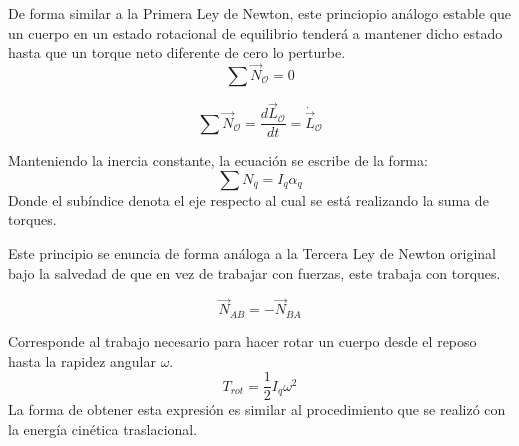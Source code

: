 \documentclass[/home/hernan-barquero/Documents/Apuntes_mecanica_teorica/main.tex]{subfiles}
\begin{document}

	\begin{definition}
		De forma similar a la Primera Ley de Newton, este princiopio análogo estable que un cuerpo en un estado rotacional de equilibrio tenderá a mantener dicho estado hasta que un torque neto diferente de cero lo perturbe.
		\begin{equation}
			\sum \vec{N}_{\mathcal{O}} = 0
			\label{eq: Nfirstlawrot}
		\end{equation}
		
	\end{definition}

	\begin{definition}
		\begin{equation}
			\sum \vec{N}_{\mathcal{O}} = \frac{d \vec{L}_{\mathcal{O}}}{dt} = \dot{\vec{L}}_{\mathcal{O}}
			\label{eq: NSecondlawrot}
		\end{equation}

		Manteniendo la inercia constante, la ecuación se escribe de la forma:
		\begin{equation}
			\sum N_{q} = I_{q} \alpha_{q}
		\end{equation}
		Donde el subíndice denota el eje respecto al cual se está realizando la suma de torques.
	\end{definition}

	\newpage
	\begin{definition} 
		Este principio se enuncia de forma análoga a la Tercera Ley de Newton original bajo la salvedad de que en vez de trabajar con fuerzas, este trabaja con torques.

		\begin{equation}
			\vec{N}_{AB} = - \vec{N}_{BA}
			\label{eq: NThirdlawrot}
		\end{equation}
		
	\end{definition}

	\begin{definition}
		Corresponde al trabajo necesario para hacer rotar un cuerpo desde el reposo hasta la rapidez angular $\omega$.
		\begin{equation}
			T_{rot} = \frac{1}{2}I_{q}\omega^{2}
			\label{eq: Trot}
		\end{equation}
		La forma de obtener esta expresión es similar al procedimiento que se realizó con la energía cinética traslacional.
	\end{definition}
\end{document}
